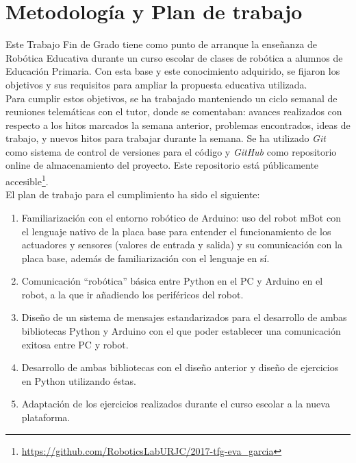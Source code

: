\section{Metodología y Plan de trabajo}\label{sec:metologia}
Este Trabajo Fin de Grado tiene como punto de arranque la enseñanza de Robótica Educativa durante un curso escolar de clases de robótica a alumnos de Educación Primaria. Con esta base y este conocimiento adquirido, se fijaron los objetivos y sus requisitos para ampliar la propuesta educativa utilizada.\\
Para cumplir estos objetivos, se ha trabajado manteniendo un ciclo semanal de reuniones telemáticas con el tutor, donde se comentaban: avances realizados con respecto a los hitos marcados la semana anterior, problemas encontrados, ideas de trabajo, y nuevos hitos para trabajar durante la semana. Se ha utilizado \textit{Git} como sistema de control de versiones para el código y \textit{GitHub} como repositorio online de almacenamiento del proyecto. Este repositorio está públicamente accesible\footnote{\href{https://github.com/RoboticsLabURJC/2017-tfg-eva_garcia}{https://github.com/RoboticsLabURJC/2017-tfg-eva\_garcia}}.\\
El plan de trabajo para el cumplimiento ha sido el siguiente:
\begin{enumerate}
	\item Familiarización con el entorno robótico de Arduino: uso del robot mBot con el lenguaje nativo de la placa base para entender el funcionamiento de los actuadores y sensores (valores de entrada y salida) y su comunicación con la placa base, además de familiarización con el lenguaje en sí. 
	\item Comunicación ``robótica'' básica entre Python en el PC y Arduino en el robot, a la que ir añadiendo los periféricos del robot.
	\item Diseño de un sistema de mensajes estandarizados para el desarrollo de ambas bibliotecas Python y Arduino con el que poder establecer una comunicación exitosa entre PC y robot.
	\item Desarrollo de ambas bibliotecas con el diseño anterior y diseño de ejercicios en Python utilizando éstas.
	\item Adaptación de los ejercicios realizados durante el curso escolar a la nueva plataforma.
\end{enumerate}
